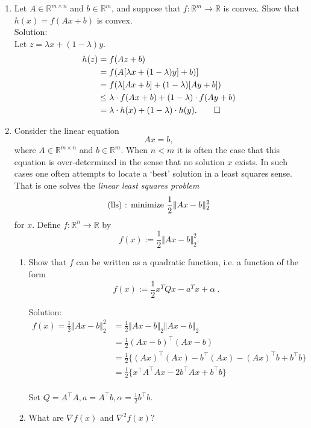 \documentclass[12pt]{amsart}
\newcommand{\norm}[1]{\Vert #1 \Vert}
\newcommand{\Rn}{\R^n}
\newcommand{\Rm}{\R^m}
\newcommand{\R}{{\mathbb{R}}}
\newcommand{\grad}{\nabla}
\newcommand{\map}[3]{#1:#2\rightarrow #3}
\newcommand{\half}{\frac{1}{2}}
\newcommand{\Rmn}{\R^{m\times n}}
\newcommand{\tpose}[1]{#1^{\scriptscriptstyle T}}
\begin{document}
\begin{enumerate}
\item
Let $A\in\R^{m\times n}$ and $b\in\Rm$, and suppose that
$\map{f}{\Rm}{\R}$ is convex. Show that $h(x)=f(Ax+b)$ is convex. \\

\noindent
Solution: \\

Let $z = \lambda x + (1-\lambda) y$.
\begin{align*}
h(z) &= f(Az + b)\\
&= f(A[\lambda x + (1-\lambda) y] + b)]\\
&= f(\lambda[Ax+b] + (1-\lambda)[Ay+b])\\
&\leq \lambda \cdot f(Ax+b) + (1-\lambda) \cdot f(Ay+b)\\
&= \lambda \cdot h(x) + (1-\lambda) \cdot h(y).  \qed
\end{align*}

\item
 Consider the linear equation $$Ax=b,$$ where $A \in \Rmn$
and $b \in \Rm$. When $n<m$ it is often the case that this
equation is over-determined in the sense that no solution $x$
exists. In such cases one often attempts to locate a `best'
solution in a least squares sense. That is one solves the
{\it linear least squares problem}
$$\hbox{(lls) : minimize } \half \norm{Ax-b}^2_2$$
for $x$. Define $\map{f}{\Rn}{\R}$ by
$$f(x):= \half \norm{Ax-b}^2_2.$$
\begin{enumerate}
\item Show that $f$ can be written as a quadratic function, i.e.
a function of the form
$$f(x):=\frac{1}{2} \tpose{x} Q x -\tpose{a}x +\alpha \  .$$

\noindent
Solution:\\
\begin{align*}
f(x) = \frac{1}{2} \norm{Ax-b}^2_2 &= \frac{1}{2}\norm{Ax-b}_2 \norm{Ax-b}_2 \\
&= \frac{1}{2} (Ax-b)^\top (Ax-b) \\
&= \frac{1}{2} \{(Ax)^\top (Ax) - b^\top (Ax) - (Ax)^\top b + b^\top b \} \\
&= \frac{1}{2} \{x^\top A^\top A x - 2 b^\top Ax + b^\top b \} 
\end{align*} \\

Set $Q = A^\top A, a = A^\top b, \alpha = \frac{1}{2} b^\top b$. \\

\item What are $\grad f(x)$ and $\grad^2 f(x)$? \\


\end{enumerate}
\end{enumerate}
\end{document}

